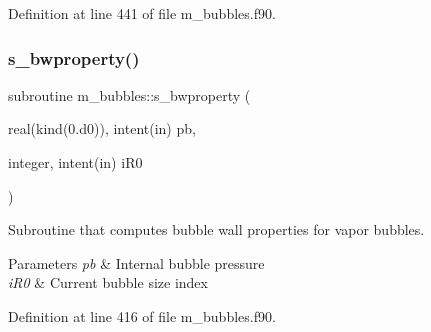 Definition at line 441 of file m\+\_\+bubbles.\+f90.

\mbox{\label{namespacem__bubbles_a784afc585b20a8450d23867931c0b5fc}} 
\subsubsection{\texorpdfstring{s\+\_\+bwproperty()}{s\_bwproperty()}}
{\footnotesize\ttfamily subroutine m\+\_\+bubbles\+::s\+\_\+bwproperty (\begin{DoxyParamCaption}\item[{real(kind(0.d0)), intent(in)}]{pb,  }\item[{integer, intent(in)}]{i\+R0 }\end{DoxyParamCaption})}



Subroutine that computes bubble wall properties for vapor bubbles. 


\begin{DoxyParams}{Parameters}
{\em pb} & Internal bubble pressure \\
\hline
{\em i\+R0} & Current bubble size index \\
\hline
\end{DoxyParams}


Definition at line 416 of file m\+\_\+bubbles.\+f90.

\mbox{\label{namespacem__bubbles_af5559af46da9282b9cc64db837958f90}} 
